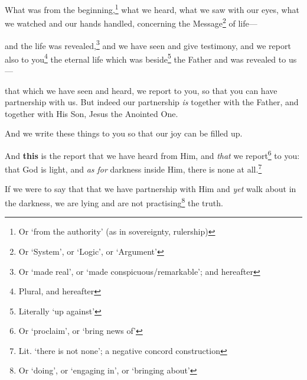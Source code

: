\documentclass[article]{memoir}%
\newcounter{vnum}
\renewcommand*{\chapter}{
	\vspace{\baselineskip}
	\settowidth{\chapindent}{\chapnumfont 999}
	\noindent\llap{\makebox[\chapindent][l]{%
		\chapnumfont \thechapter}}%
	\addtocounter{chapter}{1}
}
\newcommand{\vnum}{%
	\textsuperscript{\thevnum}%
	\addtocounter{vnum}{1}%
}
\newcommand{\infer}[1]{\textit{#1}}
\newcommand{\focus}[1]{\textbf{#1}}
\renewcommand*{\book}[1]{%
	\makebox[\textwidth][c]{\centering \booktitlefont #1}%
}
\begin{document}
\book{1 John}
	
\chapter{} \vnum What was from the beginning,\footnote{Or ‘from the authority’ (as in sovereignty, rulership)} what we heard, what we saw with our eyes, what we watched and our hands handled, concerning the Message\footnote{Or ‘System’, or ‘Logic’, or ‘Argument’} of life---\vnum and the life was revealed,\footnote{Or `made real', or `made conspicuous/remarkable'; and hereafter} and we have seen and give testimony, and we report also to you\footnote{Plural, and hereafter} the eternal life which was beside\footnote{Literally ‘up against’} the Father and was revealed to us---\vnum that which we have seen and heard, we report to you, so that you can have partnership with us. But indeed our partnership \infer{is} together with the Father, and together with His Son, Jesus the Anointed One. \vnum And we write these things to you so that our joy can be filled up.

\vnum And \focus{this} is the report that we have heard from Him, and \infer{that} we report\footnote{Or `proclaim', or `bring news of'} to you: that God is light, and \infer{as for} darkness inside Him, there is none at all.\footnote{Lit. `there is not none'; a negative concord construction} \vnum If we were to say that that we have partnership with Him and \infer{yet} walk about in the darkness, we are lying and are not practising\footnote{Or `doing', or `engaging in', or `bringing about'} the truth.
\end{document}
